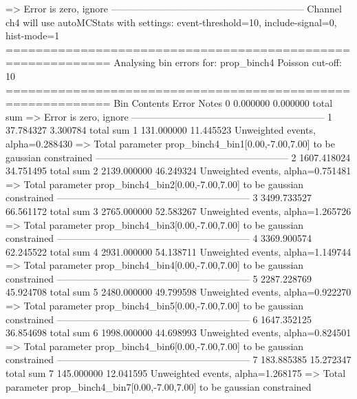   => Error is zero, ignore      
------------------------------------------------------------
Channel ch4 will use autoMCStats with settings: event-threshold=10, include-signal=0, hist-mode=1
============================================================
Analysing bin errors for: prop_binch4
Poisson cut-off: 10
============================================================
Bin        Contents        Error           Notes                         
0          0.000000        0.000000        total sum                     
  => Error is zero, ignore      
------------------------------------------------------------
1          37.784327       3.300784        total sum                     
1          131.000000      11.445523       Unweighted events, alpha=0.288430
  => Total parameter prop_binch4_bin1[0.00,-7.00,7.00] to be gaussian constrained
------------------------------------------------------------
2          1607.418024     34.751495       total sum                     
2          2139.000000     46.249324       Unweighted events, alpha=0.751481
  => Total parameter prop_binch4_bin2[0.00,-7.00,7.00] to be gaussian constrained
------------------------------------------------------------
3          3499.733527     66.561172       total sum                     
3          2765.000000     52.583267       Unweighted events, alpha=1.265726
  => Total parameter prop_binch4_bin3[0.00,-7.00,7.00] to be gaussian constrained
------------------------------------------------------------
4          3369.900574     62.245522       total sum                     
4          2931.000000     54.138711       Unweighted events, alpha=1.149744
  => Total parameter prop_binch4_bin4[0.00,-7.00,7.00] to be gaussian constrained
------------------------------------------------------------
5          2287.228769     45.924708       total sum                     
5          2480.000000     49.799598       Unweighted events, alpha=0.922270
  => Total parameter prop_binch4_bin5[0.00,-7.00,7.00] to be gaussian constrained
------------------------------------------------------------
6          1647.352125     36.854698       total sum                     
6          1998.000000     44.698993       Unweighted events, alpha=0.824501
  => Total parameter prop_binch4_bin6[0.00,-7.00,7.00] to be gaussian constrained
------------------------------------------------------------
7          183.885385      15.272347       total sum                     
7          145.000000      12.041595       Unweighted events, alpha=1.268175
  => Total parameter prop_binch4_bin7[0.00,-7.00,7.00] to be gaussian constrained
